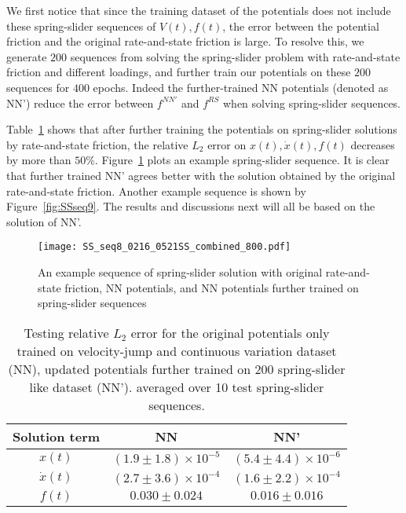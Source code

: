 We first notice that since the training dataset of the potentials does not include these spring-slider sequences of $V(t), f(t)$, 
the error between the potential friction and
the original rate-and-state friction is large. 
To resolve this, 
we generate $200$ sequences from solving the spring-slider problem with rate-and-state friction and different loadings, 
and further train our potentials on these $200$ sequences for $400$ epochs. 
Indeed the further-trained NN potentials (denoted as NN') reduce the error between $f^{NN'}$ and $f^{RS}$ when solving spring-slider sequences. 

Table~\ref{tab:NNvsNNPrime} shows that after further training the potentials on spring-slider solutions by rate-and-state friction, 
the relative $L_2$ error on $x(t), \dot{x}(t), f(t)$ decreases by more than $50\%$. 
Figure~\ref{fig:SSseq8} plots an example spring-slider sequence. 
It is clear that further trained NN' agrees better with the solution obtained by the original rate-and-state friction. 
Another example sequence is shown by Figure~\ref{fig:SSseq9}.
The results and discussions next will all be based on the solution of NN'. 

\begin{figure}[htb!]
    \centering
    \texttt{[image: SS\_seq8\_0216\_0521SS\_combined\_800.pdf]}
    \caption{An example sequence of spring-slider solution with original rate-and-state friction, 
    NN potentials, 
    and NN potentials further trained on spring-slider sequences}
    \label{fig:SSseq8}
\end{figure}

\begin{table}[htb!]
    \centering
    \begin{tabular}{ccc}
        \hline
        Solution term & NN & NN' \\
        \hline
        $x(t)$ & $(1.9 \pm 1.8)\times 10^{-5}$ & $(5.4 \pm 4.4 )\times 10^{-6}$\\
        $\dot{x}(t)$ & $(2.7 \pm 3.6)\times 10^{-4}$ & $(1.6 \pm 2.2)\times 10^{-4}$\\
        $f(t)$ & $0.030 \pm 0.024$ & $0.016 \pm 0.016$\\
        \hline
    \end{tabular}
    \caption{Testing relative $L_2$ error for the original potentials only trained on velocity-jump and continuous variation dataset (NN), 
    updated potentials further trained on 200 spring-slider like dataset (NN'). 
    averaged over 10 test spring-slider sequences. }
    \label{tab:NNvsNNPrime}
\end{table}

